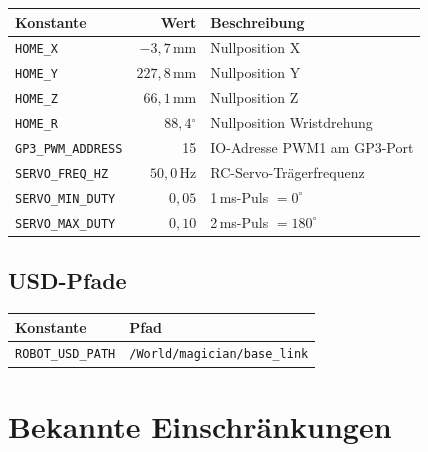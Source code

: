 \documentclass[11pt,a4paper]{article}
\begin{document}
\begin{center}
\begin{tabular}{lrl}
  \toprule
  Konstante & Wert & Beschreibung \\
  \midrule
  \texttt{HOME\_X} & $-3{,}7$\,mm & Nullposition X \\
  \texttt{HOME\_Y} & $227{,}8$\,mm & Nullposition Y \\
  \texttt{HOME\_Z} & $66{,}1$\,mm & Nullposition Z \\
  \texttt{HOME\_R} & $88{,}4{{}^\circ}$ & Nullposition Wristdrehung \\
  \texttt{GP3\_PWM\_ADDRESS} & 15 & IO-Adresse PWM1 am GP3-Port \\
  \texttt{SERVO\_FREQ\_HZ} & $50{,}0$\,Hz & RC-Servo-Trägerfrequenz \\
  \texttt{SERVO\_MIN\_DUTY} & $0{,}05$ & 1\,ms-Puls $= 0^{\circ}$ \\
  \texttt{SERVO\_MAX\_DUTY} & $0{,}10$ & 2\,ms-Puls $= 180^{\circ}$ \\
  \bottomrule
\end{tabular}
\end{center}

\subsection{USD-Pfade}

\begin{center}
\begin{tabular}{lp{8cm}}
  \toprule
  Konstante & Pfad \\
  \midrule
  \texttt{ROBOT\_USD\_PATH} & \texttt{/World/magician/base\_link} \\
  \bottomrule
\end{tabular}
\end{center}

\section{Bekannte Einschränkungen}
\label{sec:einschraenkungen}
\end{document}

